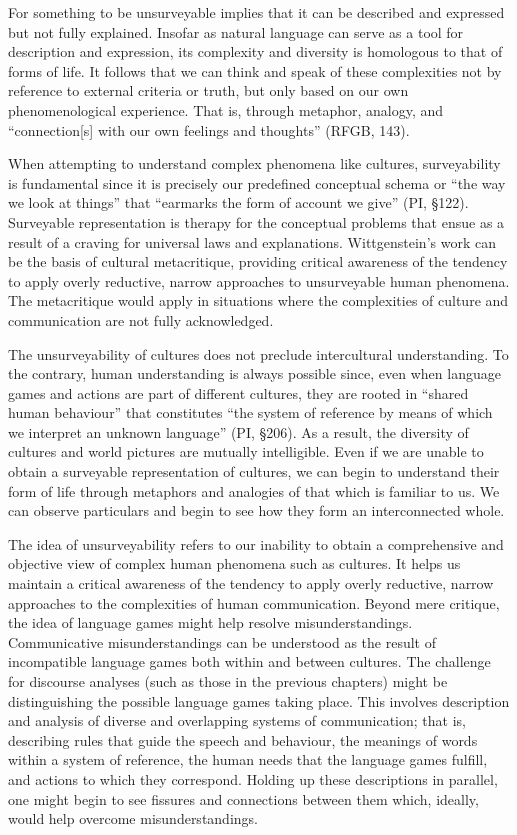 For something to be unsurveyable implies that it can be described and expressed but not fully explained. Insofar as natural language can serve as a tool for description and expression, its complexity and diversity is homologous to that of forms of life. It follows that we can think and speak of these complexities not by reference to external criteria or truth, but only based on our own phenomenological experience. That is, through metaphor, analogy, and ``connection[s] with our own feelings and thoughts'' (RFGB, 143).

When attempting to understand complex phenomena like cultures, surveyability is fundamental since it is precisely our predefined conceptual schema or ``the way we look at things'' that ``earmarks the form of account we give'' (PI, \S   122). Surveyable representation is therapy for the conceptual problems that ensue as a result of a craving for universal laws and explanations. Wittgenstein's work can be the basis of cultural metacritique, providing critical awareness of the tendency to apply overly reductive, narrow approaches to unsurveyable human phenomena. The metacritique would apply in situations where the complexities of culture and communication are not fully acknowledged.

The unsurveyability of cultures does not preclude intercultural understanding. To the contrary, human understanding is always possible since, even when language games and actions are part of different cultures, they are rooted in ``shared human behaviour'' that constitutes ``the system of reference by means of which we interpret an unknown language'' (PI, \S   206). As a result, the diversity of cultures and world pictures are mutually intelligible. Even if we are unable to obtain a surveyable representation of cultures, we can begin to understand their form of life through metaphors and analogies of that which is familiar to us. We can observe particulars and begin to see how they form an interconnected whole.

The idea of unsurveyability refers to our inability to obtain a comprehensive and objective view of complex human phenomena such as cultures. It helps us maintain a critical awareness of the tendency to apply overly reductive, narrow approaches to the complexities of human communication. Beyond mere critique, the idea of language games might help resolve misunderstandings. Communicative misunderstandings can be understood as the result of incompatible language games both within and between cultures. The challenge for discourse analyses (such as those in the previous chapters) might be distinguishing the possible language games taking place. This involves description and analysis of diverse and overlapping systems of communication; that is, describing rules that guide the speech and behaviour, the meanings of words within a system of reference, the human needs that the language games fulfill, and actions to which they correspond. Holding up these descriptions in parallel, one might begin to see fissures and connections between them which, ideally, would help overcome misunderstandings. 

